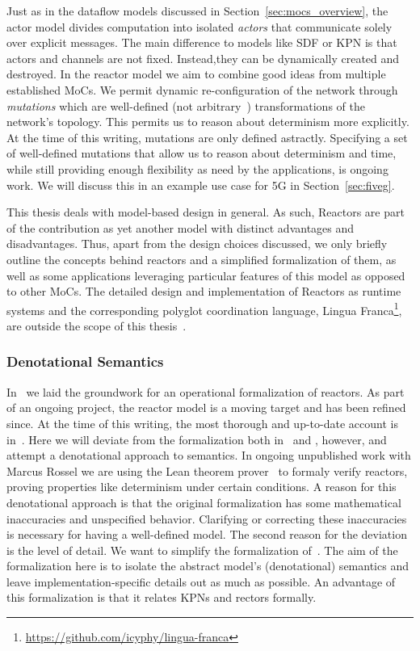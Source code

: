 Just as in the dataflow models discussed in Section~\ref{sec:mocs_overview}, the actor model divides computation into isolated \emph{actors} that communicate solely over explicit messages.
The main difference to models like \ac{SDF} or \ac{KPN} is that actors and channels are not fixed.
Instead,they can be dynamically created and destroyed.
In the reactor model we aim to combine good ideas from multiple established \acp{MoC}.
We permit dynamic re-configuration of the network through \emph{mutations} which are well-defined (not arbitrary~\cite{lohstroh_cyphy19}) transformations of the network's topology.
This permits us to reason about determinism more explicitly. 
At the time of this writing, mutations are only defined astractly.
Specifying a set of well-defined mutations that allow us to reason about determinism and time, while still providing enough flexibility as need by the applications, is ongoing work.
We will discuss this in an example use case for 5G in Section~\ref{sec:fiveg}.

This thesis deals with model-based design in general.
As such, Reactors are part of the contribution as yet another model with distinct advantages and disadvantages.
Thus, apart from the design choices discussed, we only briefly outline the concepts behind reactors and a simplified formalization of them, as well as some applications leveraging particular features of this model as opposed to other \acp{MoC}.
The detailed design and implementation of Reactors as runtime systems and the corresponding polyglot coordination language, Lingua Franca\footnote{\url{https://github.com/icyphy/lingua-franca}}, are outside the scope of this thesis~\cite{lingua_franca,lohstroh_phdthesis}.

\subsubsection{Denotational Semantics}

In~\cite{lohstroh_cyphy19} we laid the groundwork for an operational formalization of reactors.
As part of an ongoing project, the reactor model is a moving target and has been refined since.
At the time of this writing, the most thorough and up-to-date account is in~\cite{lohstroh_phdthesis}.
Here we will deviate from the formalization both in~\cite{lohstroh_cyphy19} and \cite{lohstroh_phdthesis}, however, and attempt a denotational approach to semantics.
In ongoing unpublished work with Marcus Rossel we are using the Lean theorem prover~\cite{lean} to formaly verify reactors, proving properties like determinism under certain conditions.
A reason for this denotational approach is that the original formalization has some mathematical inaccuracies and unspecified behavior.
Clarifying or correcting these inaccuracies is necessary for having a well-defined model.
The second reason for the deviation is the level of detail.
We want to simplify the formalization of~\cite{lohstroh_cyphy19,lohstroh_phdthesis}.
The aim of the formalization here is to isolate the abstract model's (denotational) semantics and leave implementation-specific details out as much as possible.
An advantage of this formalization is that it relates \acp{KPN} and rectors formally.

